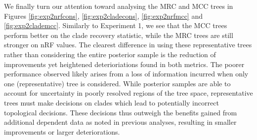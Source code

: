 We finally turn our attention toward analysing the MRC and MCC trees in Figures \ref{fig:exp2nrfcons}, \ref{fig:exp2cladecons}, \ref{fig:exp2nrfmcc} and \ref{fig:exp2clademcc}. Similarly to Experiment 1, we see that the MCC trees perform better on the clade recovery statistic, while the MRC trees are still stronger on nRF values. The clearest difference in using these representative trees rather than considering the entire posterior sample is the reduction of improvements yet heightened deterioriations found in both metrics. The poorer performance observed likely arises from a loss of information incurred when only one (representative) tree is considered. While posterior samples are able to account for uncertainty in poorly resolved regions of the tree space, representative trees must make decisions on clades which lead to potentially incorrect topological decisions. These decisions thus outweigh the benefits gained from additional dependent data as noted in previous analyses, resulting in smaller improvements or larger deteriorations.